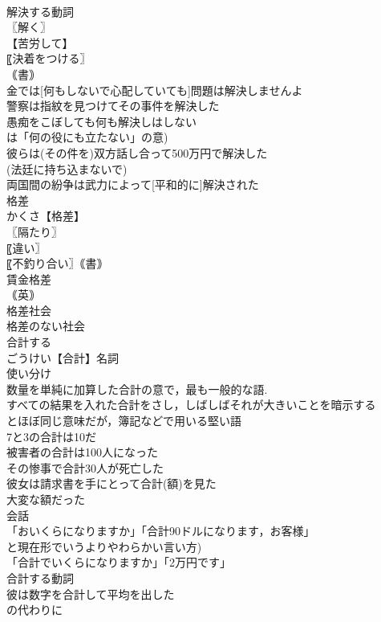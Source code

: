 \documentclass[8pt]{extreport}
\begin{document}
\begin{CJK}{UTF8}{min}
\\	解決する動詞
\\	〖解く〗
\\	【苦労して】
\\	〖決着をつける〗
\\	｟書｠
\\	金では[何もしないで心配していても]問題は解決しませんよ
\\	警察は指紋を見つけてその事件を解決した
\\	愚痴をこぼしても何も解決しはしない
\\	は「何の役にも立たない」の意)
\\	彼らは(その件を)双方話し合って500万円で解決した
\\	(法廷に持ち込まないで) 
\\	両国間の紛争は武力によって[平和的に]解決された
\\	格差		
\\	かくさ【格差】
\\	〖隔たり〗
\\	〖違い〗
\\	〖不釣り合い〗｟書｠
\\	賃金格差
\\	｟英｠
\\	格差社会
\\	格差のない社会
\\	合計する		
\\	ごうけい【合計】名詞
\\	使い分け
\\	数量を単純に加算した合計の意で，最も一般的な語.
\\	すべての結果を入れた合計をさし，しばしばそれが大きいことを暗示する
\\	とほぼ同じ意味だが，簿記などで用いる堅い語
\\	7と3の合計は10だ
\\	被害者の合計は100人になった
\\	その惨事で合計30人が死亡した
\\	彼女は請求書を手にとって合計(額)を見た
\\	大変な額だった
\\	会話
\\	「おいくらになりますか」「合計90ドルになります，お客様」
\\	と現在形でいうよりやわらかい言い方)
\\	「合計でいくらになりますか」「2万円です」
\\	合計する動詞
\\	彼は数字を合計して平均を出した
\\	の代わりに 

\end{CJK}
\end{document}
